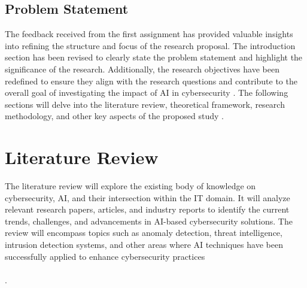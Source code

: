\documentclass[a4paper,man,12pt]{article}
\begin{document}
  \subsection{Problem Statement}
    
  The feedback received from the first assignment has provided valuable insights into refining the structure and focus of the research proposal. The introduction section has been revised to clearly state the problem statement and highlight the significance of the research. Additionally, the research objectives have been redefined to ensure they align with the research questions and contribute to the overall goal of investigating the impact of AI in cybersecurity \parencite{003,004}. The following sections will delve into the literature review, theoretical framework, research methodology, and other key aspects of the proposed study \cite{012} \textcite{011}.



\section{Literature Review}

  
  The literature review will explore the existing body of knowledge on cybersecurity, AI, and their intersection within the IT domain. It will analyze relevant research papers, articles, and industry reports to identify the current trends, challenges, and advancements in AI-based cybersecurity solutions. The review will encompass topics such as anomaly detection, threat intelligence, intrusion detection systems, and other areas where AI techniques have been successfully applied to enhance cybersecurity practices \paragraph{}
  \cite{001,005,006}.
  
  
\end{document}
